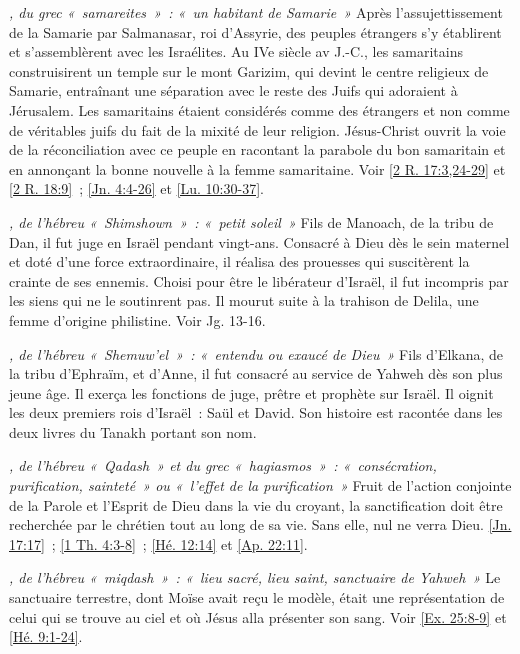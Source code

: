 \begin{multicols}{2}
\textit{, du grec «~samareites~»~: «~un habitant de Samarie~»}\newline
Après l'assujettissement de la Samarie par Salmanasar, roi d'Assyrie, des peuples étrangers s'y établirent et s'assemblèrent avec les Israélites. Au IVe siècle av J.-C., les samaritains construisirent un temple sur le mont Garizim, qui devint le centre religieux de Samarie, entraînant une séparation avec le reste des Juifs qui adoraient à Jérusalem. Les samaritains étaient considérés comme des étrangers et non comme de véritables juifs du fait de la mixité de leur religion. Jésus-Christ ouvrit la voie de la réconciliation avec ce peuple en racontant la parabole du bon samaritain et en annonçant la bonne nouvelle à la femme samaritaine. Voir \vref{2 R. 17:3,24-29} et \vref{2 R. 18:9}~; \vref{Jn. 4:4-26} et \vref{Lu. 10:30-37}.

\textit{, de l'hébreu «~Shimshown~»~: «~petit soleil~»}\newline
Fils de Manoach, de la tribu de Dan, il fut juge en Israël pendant vingt-ans. Consacré à Dieu dès le sein maternel et doté d'une force extraordinaire, il réalisa des prouesses qui suscitèrent la crainte de ses ennemis. Choisi pour être le libérateur d'Israël, il fut incompris par les siens qui ne le soutinrent pas. Il mourut suite à la trahison de Delila, une femme d'origine philistine. Voir Jg. 13-16.

\textit{, de l'hébreu «~Shemuw'el~»~: «~entendu ou exaucé de Dieu~»}\newline
Fils d'Elkana, de la tribu d'Ephraïm, et d'Anne, il fut consacré au service de Yahweh dès son plus jeune âge. Il exerça les fonctions de juge, prêtre et prophète sur Israël. Il oignit les deux premiers rois d'Israël~: Saül et David. Son histoire est racontée dans les deux livres du Tanakh portant son nom.

\textit{, de l'hébreu «~Qadash~» et du grec «~hagiasmos~»~: «~consécration, purification, sainteté~» ou «~l'effet de la purification~»}\newline
Fruit de l'action conjointe de la Parole et l'Esprit de Dieu dans la vie du croyant, la sanctification doit être recherchée par le chrétien tout au long de sa vie. Sans elle, nul ne verra Dieu. \vref{Jn. 17:17}~; \vref{1 Th. 4:3-8}~; \vref{Hé. 12:14} et \vref{Ap. 22:11}.

\textit{, de l'hébreu «~miqdash~»~: «~lieu sacré, lieu saint, sanctuaire de Yahweh~»}\newline
Le sanctuaire terrestre, dont Moïse avait reçu le modèle, était une représentation de celui qui se trouve au ciel et où Jésus alla présenter son sang. Voir \vref{Ex. 25:8-9} et \vref{Hé. 9:1-24}.


\end{multicols}
